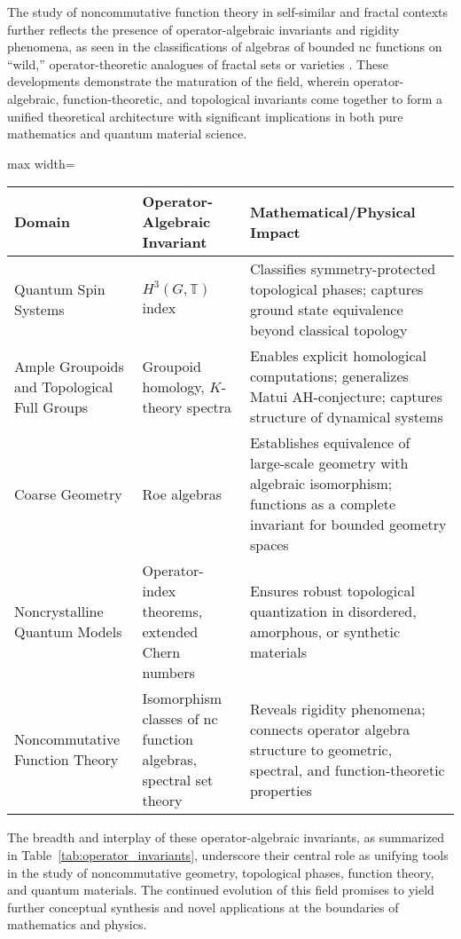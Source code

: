 \documentclass[sigconf]{acmart}
\begin{document}
The study of noncommutative function theory in self-similar and fractal contexts further reflects the presence of operator-algebraic invariants and rigidity phenomena, as seen in the classifications of algebras of bounded nc functions on ``wild,'' operator-theoretic analogues of fractal sets or varieties \cite{ref98,ref14}. These developments demonstrate the maturation of the field, wherein operator-algebraic, function-theoretic, and topological invariants come together to form a unified theoretical architecture with significant implications in both pure mathematics and quantum material science.

\begin{table*}[htbp]
\centering
\caption{Summary of Key Operator-Algebraic Invariants across Topics}
\label{tab:operator_invariants}
\begin{adjustbox}{max width=\textwidth}
\begin{tabular}{lll}
\toprule
\textbf{Domain} & \textbf{Operator-Algebraic Invariant} & \textbf{Mathematical/Physical Impact} \\
\midrule
Quantum Spin Systems     & $H^3(G, \mathbb{T})$ index & Classifies symmetry-protected topological phases; captures ground state equivalence beyond classical topology \\
Ample Groupoids and Topological Full Groups & Groupoid homology, $K$-theory spectra & Enables explicit homological computations; generalizes Matui AH-conjecture; captures structure of dynamical systems \\
Coarse Geometry         & Roe algebras              & Establishes equivalence of large-scale geometry with algebraic isomorphism; functions as a complete invariant for bounded geometry spaces \\
Noncrystalline Quantum Models & Operator-index theorems, extended Chern numbers & Ensures robust topological quantization in disordered, amorphous, or synthetic materials \\
Noncommutative Function Theory & Isomorphism classes of nc function algebras, spectral set theory & Reveals rigidity phenomena; connects operator algebra structure to geometric, spectral, and function-theoretic properties \\
\bottomrule
\end{tabular}
\end{adjustbox}
\end{table*}

The breadth and interplay of these operator-algebraic invariants, as summarized in Table~\ref{tab:operator_invariants}, underscore their central role as unifying tools in the study of noncommutative geometry, topological phases, function theory, and quantum materials. The continued evolution of this field promises to yield further conceptual synthesis and novel applications at the boundaries of mathematics and physics.
\end{document}
